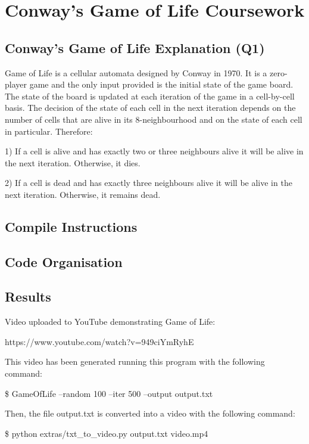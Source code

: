 \documentclass[a4paper,12pt,twoside]{report}
\author{Luis Carlos Garcia-Peraza Herrera}
\date{\today}
\begin{document}
\chapter*{Conway's Game of Life Coursework}
\section*{Conway's Game of Life Explanation (Q1)}
	
Game of Life is a cellular automata designed by Conway in 1970. It is a zero-player game and the only input provided is the initial state of the game board.
The state of the board is updated at each iteration of the game in a cell-by-cell basis. The decision of the state of each cell in the next iteration depends
on the number of cells that are alive in its 8-neighbourhood and on the state of each cell in particular. Therefore:

1) If a cell is alive and has exactly two or three neighbours alive it will be alive in the next iteration. Otherwise, it dies.

2) If a cell is dead and has exactly three neighbours alive it will be alive in the next iteration. Otherwise, it remains dead.

\section*{Compile Instructions}

\section*{Code Organisation}

\section*{Results}

Video uploaded to YouTube demonstrating Game of Life:

https://www.youtube.com/watch?v=949ciYmRyhE

This video has been generated running this program with the following command:

\$ GameOfLife --random 100 --iter 500 --output output.txt

Then, the file output.txt is converted into a video with the following command:

\$ python extras/txt\_to\_video.py output.txt video.mp4
	
\end{document}

